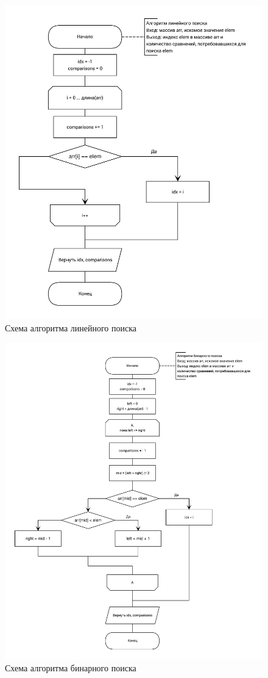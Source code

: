 \begin{figure}[!htb]
\centering
\includegraphics[width=\textwidth]{img/linear_search.pdf}
\caption{Схема алгоритма линейного поиска}
\label{fig:linear_search}
\end{figure}

\begin{figure}[!htb]
\centering
\includegraphics[width=\textwidth]{img/binary_search.pdf}
\caption{Схема алгоритма бинарного поиска}
\label{fig:binary_search}
\end{figure}
